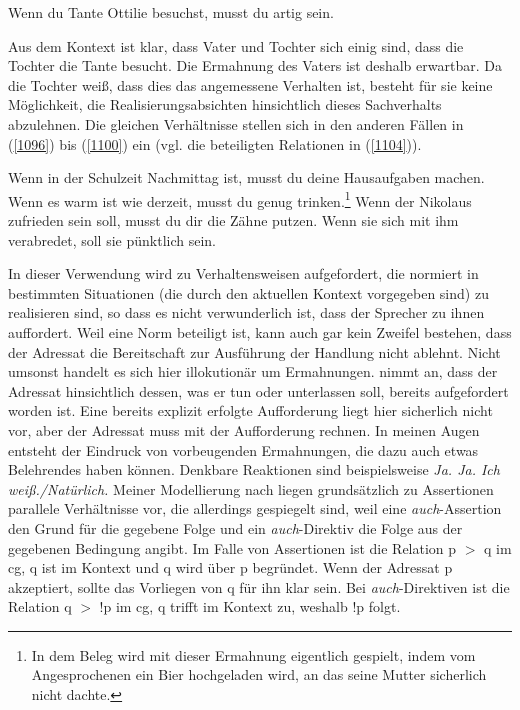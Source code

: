 {\begin{exe}
\ex\label{1103} 
	Wenn du Tante Ottilie besuchst, musst du artig sein.
\end{exe}	
Aus dem Kontext ist klar, dass Vater und Tochter sich einig sind, dass die Tochter die Tante besucht. Die Ermahnung des Vaters ist deshalb erwartbar. Da die Tochter weiß, dass dies das angemessene Verhalten ist, besteht für sie keine Möglichkeit, die Realisierungsabsichten hinsichtlich dieses Sachverhalts abzuleh\-nen. Die gleichen Verhältnisse stellen sich in den anderen Fällen in (\ref{1096}) bis (\ref{1100}) ein (vgl. die beteiligten Relationen in (\ref{1104})).

\begin{exe}
	\ex\label{1104} 
		\begin{xlist}	
			\ex\label{1104a} Wenn in der Schulzeit Nachmittag ist, musst du deine Hausaufgaben machen.
			\ex\label{1104b} Wenn es warm ist wie derzeit, musst du genug trinken.\footnote{In dem Beleg wird mit dieser Ermahnung eigentlich gespielt, 				indem vom Angesprochenen ein Bier hochgeladen wird, an das seine Mutter sicherlich nicht dachte.}
			\ex\label{1104c} Wenn der Nikolaus zufrieden sein soll, musst du dir die Zähne putzen.
			\ex\label{1104d} Wenn sie sich mit ihm verabredet, soll sie pünktlich sein.
		\end{xlist}
\end{exe}
In dieser Verwendung wird zu Verhaltensweisen aufgefordert, die normiert in bestimmten Situationen (die durch den aktuellen Kontext vorgegeben sind) zu realisieren sind, so dass es nicht verwunderlich ist, dass der Sprecher zu ihnen auffordert. Weil eine Norm beteiligt ist, kann auch gar kein Zweifel bestehen, dass der Adressat die Bereitschaft zur Ausführung der Handlung nicht ablehnt. Nicht umsonst handelt es sich hier illokutionär  um Ermahnungen. \citet[179]{Rolf1997} nimmt an, dass \glqq der Adressat hinsichtlich dessen, was er tun oder unterlassen soll, bereits aufgefordert worden ist\grqq{}. Eine bereits explizit erfolgte Aufforderung liegt hier sicherlich nicht vor, aber der Adressat muss mit der Aufforderung rechnen. In meinen Augen entsteht der Eindruck von vorbeugenden Ermahnungen, die dazu auch etwas Belehrendes haben können. Denkbare Reaktionen sind beispielsweise \textit{Ja. Ja. Ich weiß./Natürlich.} Meiner Modellierung nach liegen grundsätzlich zu Assertionen parallele Verhältnisse vor, die aller\-dings gespiegelt sind, weil eine \textit{auch}-Assertion den Grund für die gegebene Folge und ein \textit{auch}-Direktiv die Folge aus der gegebenen Bedingung angibt. Im Falle von Assertionen ist die Relation p $>$ q im cg, q ist im Kontext und q wird über p begründet. Wenn der Adressat p akzeptiert, sollte das Vorliegen von q für ihn klar sein. Bei \textit{auch}-Direktiven ist die Relation q $>$ !p im cg, q trifft im Kontext zu, weshalb !p folgt.

}
